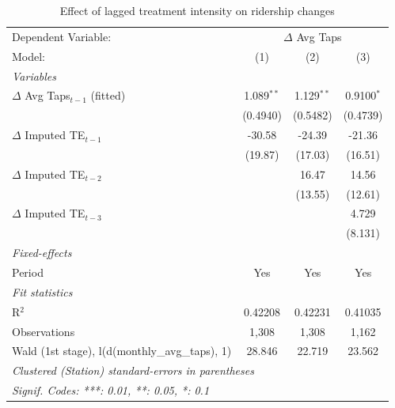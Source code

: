 
\begin{table}[htbp]
   \caption{\label{tab:behaviour_results_imputed} Effect of lagged treatment intensity on ridership changes}
   \centering
   \footnotesize
   \begin{tabular}{lccc}
      \tabularnewline \midrule \midrule
      Dependent Variable: & \multicolumn{3}{c}{$\Delta$ Avg Taps}\\
      Model:                                          & (1)          & (2)          & (3)\\  
      \midrule
      \emph{Variables}\\
      $\Delta$ Avg Taps$_{t-1}$ (fitted)              & 1.089$^{**}$ & 1.129$^{**}$ & 0.9100$^{*}$\\   
                                                      & (0.4940)     & (0.5482)     & (0.4739)\\   
      $\Delta$ Imputed TE$_{t-1}$                     & -30.58       & -24.39       & -21.36\\   
                                                      & (19.87)      & (17.03)      & (16.51)\\   
      $\Delta$ Imputed TE$_{t-2}$                     &              & 16.47        & 14.56\\   
                                                      &              & (13.55)      & (12.61)\\   
      $\Delta$ Imputed TE$_{t-3}$                     &              &              & 4.729\\   
                                                      &              &              & (8.131)\\   
      \midrule
      \emph{Fixed-effects}\\
      Period                                          & Yes          & Yes          & Yes\\  
      \midrule
      \emph{Fit statistics}\\
      R$^2$                                           & 0.42208      & 0.42231      & 0.41035\\  
      Observations                                    & 1,308        & 1,308        & 1,162\\  
      Wald (1st stage), l(d(monthly\_avg\_taps), 1)   & 28.846       & 22.719       & 23.562\\  
      \midrule \midrule
      \multicolumn{4}{l}{\emph{Clustered (Station) standard-errors in parentheses}}\\
      \multicolumn{4}{l}{\emph{Signif. Codes: ***: 0.01, **: 0.05, *: 0.1}}\\
   \end{tabular}
\end{table}


